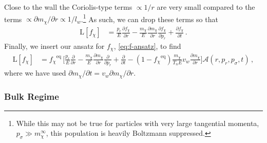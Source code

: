 \documentclass[
onecolumn, %
11pt, %
tightenlines,
superscriptaddress, %
nofootinbib, %
preprintnumbers, %
prd %
]{revtex4-1}
\newcommand{\pd}[2]{\frac{\partial #1}{\partial #2}}                  %
\newcommand{\pdtext}[2]{{\partial #1} / {\partial #2}}                %
\newcommand{\f}{\ensuremath{f_\chi}\xspace}
\newcommand{\A}{\ensuremath{\mathcal A}\xspace}
\newcommand{\feq}{\ensuremath{\f^\text{eq}}\xspace}
\begin{document}
%
Close to the wall the Coriolis-type terms $\propto 1/r$ are very small compared to the terms $\propto \pdtext{m_\chi}{r}\propto 1/l_w$.\footnote{While this may not be true for particles with very large tangential momenta, $p_\sigma \gg m_\chi^\infty$, this population is heavily Boltzmann suppressed.}  As such, we can drop these terms so that
%
\begin{align}
	\boldsymbol{\mathrm L}[\f] &=
	    \frac{p_r}{E}\pd{\f}{r}
	   - \frac{m_\chi}{E}\pd{m_\chi}{r} \pd{\f}{p_r}
	  + \pd{\f}{t} \,.
    \label{eq:liouville-2}
\end{align}
%
Finally, we insert our ansatz for $\f$, \cref{eq:f-ansatz}, to find
%
\begin{align}
    \boldsymbol{\mathrm L}[\f] &=
    \feq \, \bigg[
        \frac{p_r}{E} \pd{}{r}
        - \frac{m_\chi}{E} \pd{m_\chi}{r} \pd{}{p_r}
      + \pd{}{t} 
      - (1-\feq) \frac{m_\chi}{T_n E}v_w\pd{m_\chi}{r} 
                 \bigg] \A(r,p_r,p_\sigma,t) \,,
    \label{eq:liouville-3}
\end{align}
%
where we have used $\pdtext{m_\chi}{t} = v_w \pdtext{m_\chi}{r}$.


\subsubsection{Bulk Regime}
\end{document}
